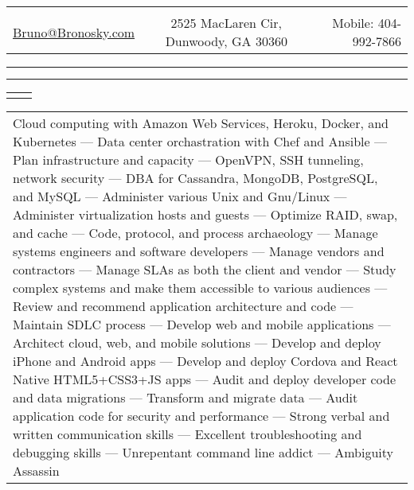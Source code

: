 \documentclass[letterpaper,10pt]{article}
\newcommand{\lineDouble}[0]{\hrule\vspace{2pt}\hrule\vspace{1.5pt}}
\newcommand{\sizeF}[0]{\fontsize{11pt}{13pt}\selectfont}
\newcommand{\heading}[4]{
    \begin{tabularx}{\textwidth}{LCR}
        &\huge{\textbf{\sc{#1}}}&\\
        \href{mailto:#2}{#2} & #3 & Mobile: #4\\
    \end{tabularx}
    \lineDouble
    \vspace{5pt}%
}
\newcounter{skipfirstcounter}
\newcommand{\blocktitle}[1]{
    \setcounter{skipfirstcounter}{0}
    \begin{tabularx}{\textwidth}{lR}
        {\sizeF\sc{#1}} & \noindent\hrulefill\\
    \end{tabularx}
}
\newcommand{\blockOverview}[1]{%
    \blocktitle{Overview}%
    \vspace{0.4mm}%
    \begin{tabular*}{\textwidth}{p{\textwidth}}%
        #1%
    \end{tabular*}%
    \vspace{2mm}%
}%
\begin{document}
\heading{Bruno Bronosky}
{Bruno@Bronosky.com}
{2525 MacLaren Cir, Dunwoody, GA 30360}
{404-992-7866}


\blockOverview{
    Cloud computing with Amazon Web Services, Heroku, Docker, and Kubernetes ---
    Data center orchastration with Chef and Ansible ---
    Plan infrastructure and capacity ---
    OpenVPN, SSH tunneling, network security ---
    DBA for Cassandra, MongoDB, PostgreSQL, and MySQL ---
    Administer various Unix and Gnu/Linux ---
    Administer virtualization hosts and guests ---
    Optimize RAID, swap, and cache ---
    Code, protocol, and process archaeology ---
    Manage systems engineers and software developers ---
    Manage vendors and contractors ---
    Manage SLAs as both the client and vendor ---
    Study complex systems and make them accessible to various audiences ---
    Review and recommend application architecture and code ---
    Maintain SDLC process ---
    Develop web and mobile applications ---
    Architect cloud, web, and mobile solutions ---
    Develop and deploy iPhone and Android apps ---
    Develop and deploy Cordova and React Native HTML5+CSS3+JS apps ---
    Audit and deploy developer code and data migrations ---
    Transform and migrate data ---
    Audit application code for security and performance ---
    Strong verbal and written communication skills ---
    Excellent troubleshooting and debugging skills ---
    Unrepentant command line addict ---
    Ambiguity Assassin
}

\end{document}
